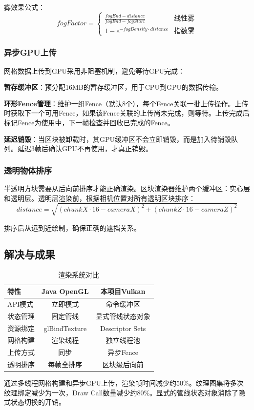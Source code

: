 雾效果公式：
\begin{equation}
fogFactor = \begin{cases}
\frac{fogEnd - distance}{fogEnd - fogStart} & \text{线性雾} \\
1 - e^{-fogDensity \cdot distance} & \text{指数雾}
\end{cases}
\end{equation}

\subsubsection{异步GPU上传}

网格数据上传到GPU采用非阻塞机制，避免等待GPU完成：

\textbf{暂存缓冲区}：预分配16MB的暂存缓冲区，用于CPU到GPU的数据传输。

\textbf{环形Fence管理}：维护一组Fence（默认8个），每个Fence关联一批上传操作。上传时获取下一个可用Fence，如果该Fence关联的上传尚未完成，则等待。上传完成后标记Fence为使用中，下一帧检查并回收已完成的Fence。

\textbf{延迟销毁}：当区块被卸载时，其GPU缓冲区不会立即销毁，而是加入待销毁队列。延迟3帧后确认GPU不再使用，才真正销毁。

\subsubsection{透明物体排序}

半透明方块需要从后向前排序才能正确渲染。区块渲染器维护两个缓冲区：实心层和透明层。透明层渲染前，根据相机位置对所有透明区块排序：
\begin{equation}
distance = \sqrt{(chunkX \cdot 16 - cameraX)^2 + (chunkZ \cdot 16 - cameraZ)^2}
\end{equation}

排序后从远到近绘制，确保正确的遮挡关系。

\subsection{解决与成果}

\begin{table}[h]
\centering
\caption{渲染系统对比}
\label{tab:render_comparison}
\begin{tabular}{lcc}
\toprule
\textbf{特性} & \textbf{Java OpenGL} & \textbf{本项目Vulkan} \\
\midrule
API模式 & 立即模式 & 命令缓冲区 \\
状态管理 & 固定管线 & 显式管线状态对象 \\
资源绑定 & glBindTexture & Descriptor Sets \\
网格构建 & 渲染线程 & 独立线程池 \\
上传方式 & 同步 & 异步Fence \\
透明排序 & 每帧全排序 & 区块级后向前 \\
\bottomrule
\end{tabular}
\end{table}

通过多线程网格构建和异步GPU上传，渲染帧时间减少约50\%。纹理图集将多次纹理绑定减少为一次，Draw Call数量减少约80\%。显式的管线状态对象消除了隐式状态切换的开销。

